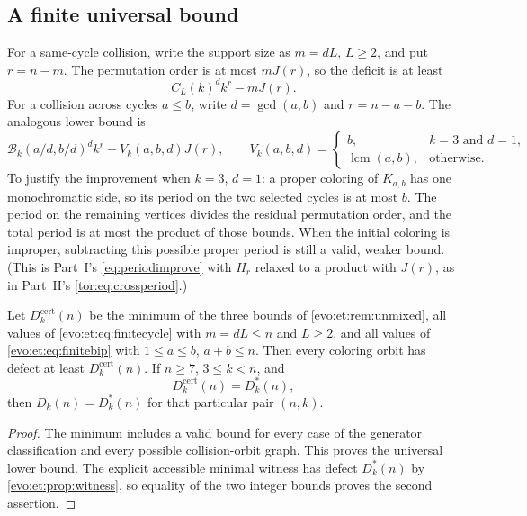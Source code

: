 \documentclass[11pt,a4paper]{article}
\numberwithin{equation}{section}
\theoremstyle{definition}
\theoremstyle{remark}
\newcommand{\lcm}{\operatorname{lcm}}
\newcommand{\Bip}{\mathcal B}
\begin{document}
\subsection{A finite universal bound}

For a same-cycle collision, write the support size as $m=dL$, $L\ge2$, and
put $r=n-m$. The permutation order is at most $mJ(r)$, so the deficit is at
least
\begin{equation}\label{evo:et:eq:finitecycle}
 C_L(k)^dk^r-mJ(r).
\end{equation}
For a collision across cycles $a\le b$, write $d=\gcd(a,b)$ and $r=n-a-b$. The
analogous lower bound is
\begin{equation}\label{evo:et:eq:finitebip}
 \Bip_k(a/d,b/d)^dk^r-V_k(a,b,d)J(r),
 \qquad
 V_k(a,b,d)=
 \begin{cases}
 b,&k=3\text{ and }d=1,\\
 \lcm(a,b),&\text{otherwise}.
 \end{cases}
\end{equation}
To justify the improvement when $k=3$, $d=1$: a proper coloring of $K_{a,b}$
has one monochromatic side, so its period on the two selected cycles is at
most $b$. The period on the remaining vertices divides the residual
permutation order, and the total period is at most the product of those
bounds. When the initial coloring is improper, subtracting this possible
proper period is still a valid, weaker bound. (This is Part~I's
\eqref{eq:periodimprove} with $H_r$ relaxed to a product with $J(r)$, as in
Part~II's \eqref{tor:eq:crossperiod}.)

\begin{proposition}\label{evo:et:prop:finite}
Let $D^{\mathrm{cert}}_k(n)$ be the minimum of the three bounds of
\cref{evo:et:rem:unmixed}, all values of \eqref{evo:et:eq:finitecycle} with
$m=dL\le n$ and $L\ge2$, and all values of \eqref{evo:et:eq:finitebip} with
$1\le a\le b$, $a+b\le n$. Then every coloring orbit has defect at least
$D^{\mathrm{cert}}_k(n)$. If $n\ge7$, $3\le k<n$, and
\begin{equation}\label{evo:et:eq:certmin}
 D^{\mathrm{cert}}_k(n)=D^*_k(n),
\end{equation}
then $D_k(n)=D^*_k(n)$ for that particular pair $(n,k)$.
\end{proposition}
\begin{proof}
The minimum includes a valid bound for every case of the generator
classification and every possible collision-orbit graph. This proves the
universal lower bound. The explicit accessible minimal witness has defect
$D^*_k(n)$ by \cref{evo:et:prop:witness}, so equality of the two integer
bounds proves the second assertion.
\end{proof}
\end{document}
